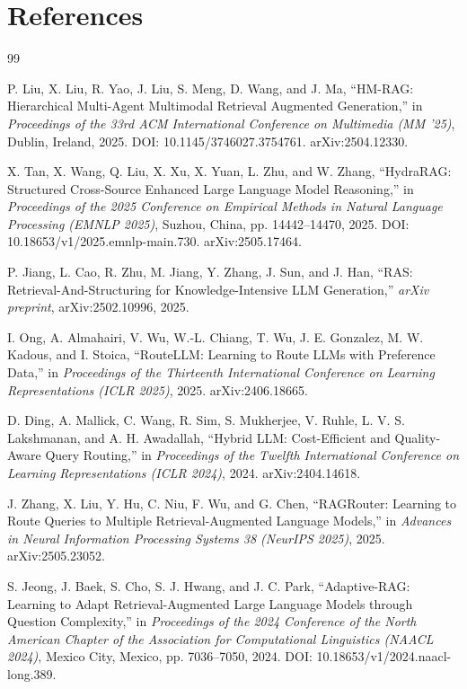 \documentclass[twocolumn,10pt]{article}
\begin{document}
\section{References}

\begin{thebibliography}{99}

P. Liu, X. Liu, R. Yao, J. Liu, S. Meng, D. Wang, and J. Ma, ``HM-RAG: Hierarchical Multi-Agent Multimodal Retrieval Augmented Generation,'' in \emph{Proceedings of the 33rd ACM International Conference on Multimedia (MM '25)}, Dublin, Ireland, 2025. DOI: 10.1145/3746027.3754761. arXiv:2504.12330.

X. Tan, X. Wang, Q. Liu, X. Xu, X. Yuan, L. Zhu, and W. Zhang, ``HydraRAG: Structured Cross-Source Enhanced Large Language Model Reasoning,'' in \emph{Proceedings of the 2025 Conference on Empirical Methods in Natural Language Processing (EMNLP 2025)}, Suzhou, China, pp. 14442--14470, 2025. DOI: 10.18653/v1/2025.emnlp-main.730. arXiv:2505.17464.

P. Jiang, L. Cao, R. Zhu, M. Jiang, Y. Zhang, J. Sun, and J. Han, ``RAS: Retrieval-And-Structuring for Knowledge-Intensive LLM Generation,'' \emph{arXiv preprint}, arXiv:2502.10996, 2025.

I. Ong, A. Almahairi, V. Wu, W.-L. Chiang, T. Wu, J. E. Gonzalez, M. W. Kadous, and I. Stoica, ``RouteLLM: Learning to Route LLMs with Preference Data,'' in \emph{Proceedings of the Thirteenth International Conference on Learning Representations (ICLR 2025)}, 2025. arXiv:2406.18665.

D. Ding, A. Mallick, C. Wang, R. Sim, S. Mukherjee, V. Ruhle, L. V. S. Lakshmanan, and A. H. Awadallah, ``Hybrid LLM: Cost-Efficient and Quality-Aware Query Routing,'' in \emph{Proceedings of the Twelfth International Conference on Learning Representations (ICLR 2024)}, 2024. arXiv:2404.14618.

J. Zhang, X. Liu, Y. Hu, C. Niu, F. Wu, and G. Chen, ``RAGRouter: Learning to Route Queries to Multiple Retrieval-Augmented Language Models,'' in \emph{Advances in Neural Information Processing Systems 38 (NeurIPS 2025)}, 2025. arXiv:2505.23052.

S. Jeong, J. Baek, S. Cho, S. J. Hwang, and J. C. Park, ``Adaptive-RAG: Learning to Adapt Retrieval-Augmented Large Language Models through Question Complexity,'' in \emph{Proceedings of the 2024 Conference of the North American Chapter of the Association for Computational Linguistics (NAACL 2024)}, Mexico City, Mexico, pp. 7036--7050, 2024. DOI: 10.18653/v1/2024.naacl-long.389.


\end{thebibliography}
\end{document}
